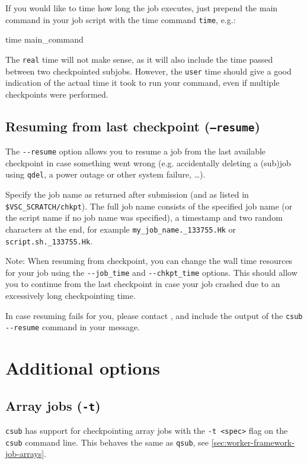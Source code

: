 If you would like to time how long the job executes, just prepend the main command in your job script with
the time command \lstinline|time|, e.g.:

\begin{prompt}
time main_command
\end{prompt}

The \lstinline|real| time will not make sense, as it will also include the time
passed between two checkpointed subjobs. However, the \lstinline|user| time should give a good
indication of the actual time it took to run your command, even if multiple checkpoints were performed.

\subsection{Resuming from last checkpoint (\texttt{--resume})}

The \lstinline|--resume| option allows you to resume a job from the
last available checkpoint in case something went wrong
(e.g. accidentally deleting a (sub)job using \lstinline|qdel|, a power outage or other system failure, \ldots).

Specify the job name as returned after submission (and as listed in \texttt{\$VSC\_SCRATCH/chkpt}).
The full job name consists of the specified job name (or the script name if no job name was specified),
a timestamp and two random characters at the end, for example \texttt{my\_job\_name.\the{}\_133755.Hk}
or \texttt{script.sh.\the{}\_133755.Hk}.

Note: When resuming from checkpoint, you can change the wall time resources for your job using the \lstinline|--job_time| and
\lstinline|--chkpt_time| options. This should allow you to continue from the last checkpoint
in case your job crashed due to an excessively long checkpointing time.

In case resuming fails for you, please contact \hpcinfo, and include the output
of the \lstinline|csub --resume| command in your message.

\section{Additional options}

\subsection{Array jobs (\texttt{-t})}

\lstinline|csub| has support for checkpointing array jobs with the \lstinline|-t <spec>|
flag on the \lstinline|csub| command line. This behaves the same as \lstinline|qsub|, see \autoref{sec:worker-framework-job-arrays}.


